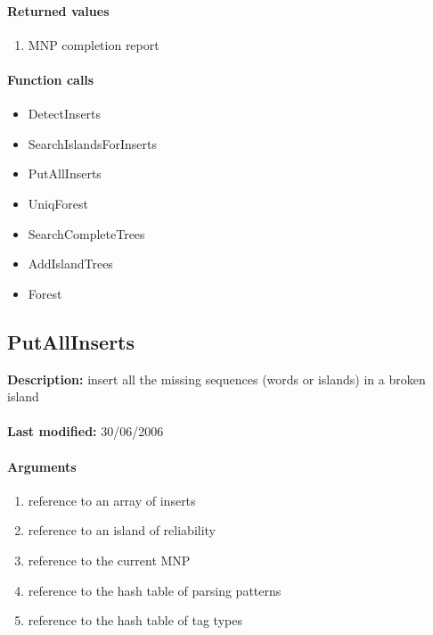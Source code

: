 \paragraph{Returned values}
\begin{enumerate}
\item MNP completion report
\end{enumerate}

\paragraph{Function calls}
\begin{itemize}
\item DetectInserts
\item SearchIslandsForInserts
\item PutAllInserts
\item UniqForest
\item SearchCompleteTrees
\item AddIslandTrees
\item Forest
\end{itemize}

\subsection{PutAllInserts}
\textbf{Description:} insert all the missing sequences (words or islands) in a broken island\\
\\\textbf{Last modified:} 30/06/2006

\paragraph{Arguments}
\begin{enumerate}
\item reference to an array of inserts
\item reference to an island of reliability
\item reference to the current MNP
\item reference to the hash table of parsing patterns
\item reference to the hash table of tag types
\end{enumerate}

